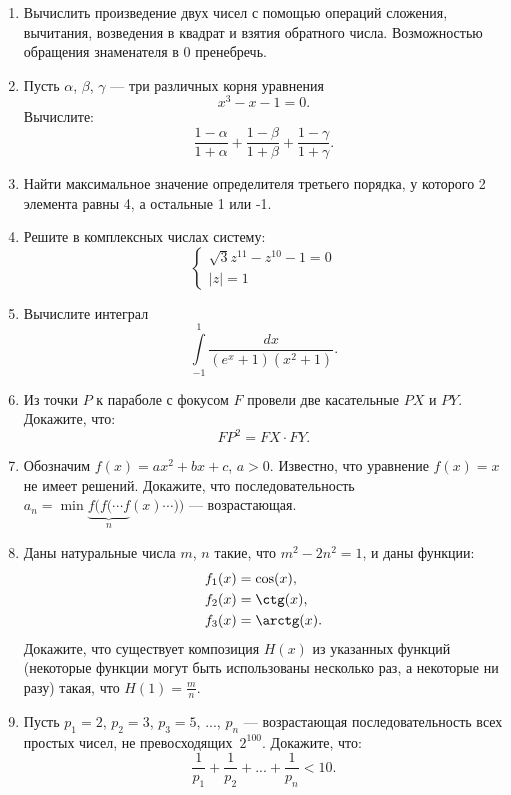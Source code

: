 \begin{enumerate}

\item Вычислить произведение двух чисел с помощью операций сложения, вычитания, возведения в квадрат и взятия обратного числа. Возможностью обращения знаменателя в 0 пренебречь.

\item Пусть $\alpha$, $\beta$, $\gamma$ --- три различных корня уравнения $$x^3 - x - 1 = 0.$$ 
Вычислите:
$$\frac{1-\alpha}{1+\alpha} + \frac{1-\beta}{1+\beta} + \frac{1-\gamma}{1+\gamma}.$$

\item Найти максимальное значение определителя третьего порядка, у которого 2 элемента равны 4, а остальные 1 или -1.

\item Решите в комплексных числах систему:
\begin{equation*}
\begin{cases}
\sqrt{3} z^{11} - z^{10} - 1 = 0 \\
|z| = 1
\end{cases}
\end{equation*}

\item Вычислите интеграл
$$\int\limits_{-1}^{1} \frac{dx}{(e^x + 1)(x^2 + 1)} .$$

\item Из точки $P$ к параболе с фокусом $F$ провели две касательные $PX$ и $PY$. Докажите, что:
$$FP^2 = FX \cdot FY .$$

\item Обозначим $f(x) = a x^2 + b x + c$, $a > 0$. Известно, что уравнение $f(x) = x$ не имеет решений. Докажите, что последовательность $a_n = \min \underbrace{f(f( \cdots f}_{n} (x) { \cdots ))} $ --- возрастающая.

\item Даны натуральные числа $m$, $n$ такие, что $m^2 - 2 n^2 = 1$, и даны функции: 
\begin{equation*}
\begin{aligned}
f_1(x) &= \cos(x),\\
f_2(x) &= \ctg(x),\\
f_3(x) &= \arctg(x). 
\end{aligned}
\end{equation*}
Докажите, что существует композиция $H(x)$ из указанных функций (некоторые функции могут быть использованы несколько раз, а некоторые ни разу) такая, что $H(1) = \frac{m}{n}$.

\item Пусть $p_1 = 2$, $p_2 = 3$, $p_3 = 5$, ..., $p_n$ --- возрастающая последовательность всех простых чисел, не превосходящих~$2^{100}$. Докажите, что:
$$\frac{1}{p_1} + \frac{1}{p_2} + ... + \frac{1}{p_n} < 10 .$$

\end{enumerate}

